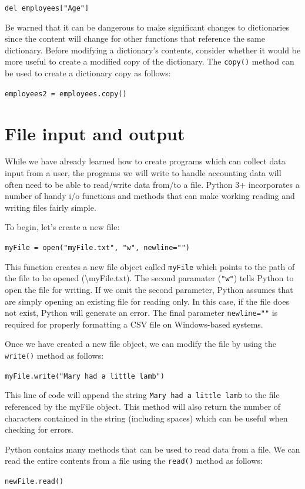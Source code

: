 \documentclass{book}
\begin{document}
\texttt{del employees["Age"]}

Be warned that it can be dangerous to make significant changes to dictionaries since the content will change for other functions that reference the same dictionary. Before modifying a dictionary's contents, consider whether it would be more useful to create a modified copy of the dictionary. The \texttt{copy()} method can be used to create a dictionary copy as follows:

\texttt{employees2 = employees.copy()}
\section{File input and output}
While we have already learned how to create programs which can collect data input from a user, the programs we will write to handle accounting data will often need to be able to read/write data from/to a file. Python 3+ incorporates a number of handy i/o functions and methods that can make working reading and writing files fairly simple.

To begin, let's create a new file:

\texttt{myFile = open("myFile.txt", "w", newline="")}

This function creates a new file object called \texttt{myFile} which points to the path of the file to be opened (\textbackslash myFile.txt). The second paramater (\texttt{"w"}) tells Python to open the file for writing. If we omit the second parameter, Python assumes that are simply opening an existing file for reading only. In this case, if the file does not exist, Python will generate an error. The final parameter \texttt{newline=""} is required for properly formatting a CSV file on Windows-based systems.

Once we have created a new file object, we can modify the file by using the \texttt{write()} method as follows:

\texttt{myFile.write("Mary had a little lamb")}

This line of code will append the string \texttt{Mary had a little lamb} to the file referenced by the myFile object. This method will also return the number of characters contained in the string (including spaces) which can be useful when checking for errors. 

Python contains many methods that can be used to read data from a file. We can read the entire contents from a file using the \texttt{read()} method as follows:

\texttt{newFile.read()}
\end{document}
